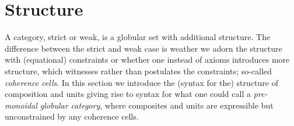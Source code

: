 \section{Structure}
\label{sec:structure}



A category, strict or weak, is a globular set with additional
structure. The difference between the strict and weak case is weather
we adorn the structure with (equational) constraints or whether one instead
of axioms introduces more structure, which witnesses rather than postulates
the constraints; so-called \emph{coherence cells}. In this section we
introduce the (syntax for the) structure of composition and units
giving rise to syntax for what one could call a \emph{pre-monoidal
  globular category}, where composites and units are expressible but
unconstrained by any coherence cells.

